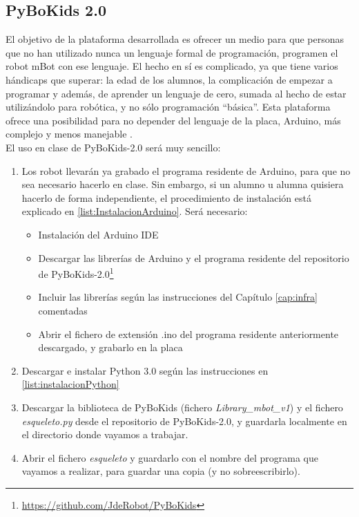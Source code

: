 \subsection{PyBoKids 2.0}
El objetivo de la plataforma desarrollada es ofrecer un medio para que personas que no han utilizado nunca un lenguaje formal de programación, programen el robot mBot con ese lenguaje. El hecho en sí es complicado, ya que tiene varios hándicaps que superar: la edad de los alumnos, la complicación de empezar a programar y además, de aprender un lenguaje de cero, sumada al hecho de estar utilizándolo para robótica, y no sólo programación ``básica''. Esta plataforma ofrece una posibilidad para no depender del lenguaje de la placa, Arduino, más complejo y menos manejable . \\
El uso en clase de  PyBoKids-2.0 será muy sencillo:
\begin{enumerate}
	\item Los robot llevarán ya grabado el programa residente de Arduino, para que no sea necesario hacerlo en clase. Sin embargo, si un alumno u alumna quisiera hacerlo de forma independiente, el procedimiento de instalación está explicado en \ref{list:InstalacionArduino}. Será necesario: 
	\begin{itemize}
		\item Instalación del Arduino IDE
		\item Descargar las librerías de Arduino y el programa residente del repositorio de PyBoKids-2.0\footnote{\href{https://github.com/JdeRobot/PyBoKids}{https://github.com/JdeRobot/PyBoKids}}
		\item Incluir las librerías según las instrucciones del Capítulo \ref{cap:infra} comentadas
		\item Abrir el fichero de extensión .ino del programa residente anteriormente descargado, y grabarlo en la placa
	\end{itemize}
	\item Descargar e instalar Python 3.0 según las instrucciones en \ref{list:instalacionPython}
	\item Descargar la biblioteca de PyBoKids (fichero \textit{Library\_mbot\_v1}) y el fichero \textit{esqueleto.py} desde el repositorio de PyBoKids-2.0, y guardarla localmente en el directorio donde vayamos a trabajar.	
	\item Abrir el fichero \textit{esqueleto} y guardarlo con el nombre del programa que vayamos a realizar, para guardar una copia (y no sobreescribirlo).
\end{enumerate}

